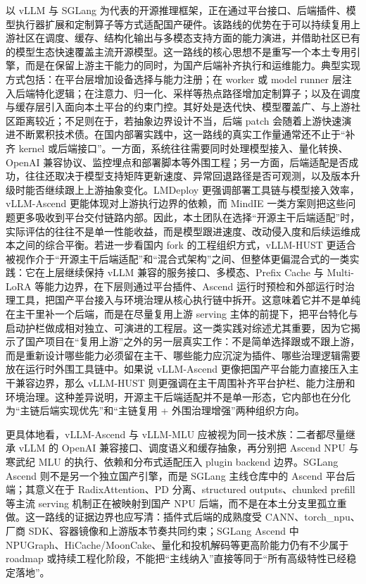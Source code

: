 以 vLLM 与 SGLang 为代表的开源推理框架，正在通过平台接口、后端插件、模型执行器扩展和定制算子等方式适配国产硬件\citep{vllm,sglang,sglangpaper,vllmascend}。该路线的优势在于可以持续复用上游社区在调度、缓存、结构化输出与多模态支持方面的能力演进，并借助社区已有的模型生态快速覆盖主流开源模型。这一路线的核心思想不是重写一个本土专用引擎，而是在保留上游主干能力的同时，为国产后端补齐执行和运维能力。典型实现方式包括：在平台层增加设备选择与能力注册；在 worker 或 model runner 层注入后端特化逻辑；在注意力、归一化、采样等热点路径增加定制算子；以及在调度与缓存层引入面向本土平台的约束门控。其好处是迭代快、模型覆盖广、与上游社区距离较近；不足则在于，若抽象边界设计不当，后端 patch 会随着上游快速演进不断累积技术债。在国内部署实践中，这一路线的真实工作量通常还不止于“补齐 kernel 或后端接口”。一方面，系统往往需要同时处理模型接入、量化转换、OpenAI 兼容协议、监控埋点和部署脚本等外围工程；另一方面，后端适配是否成功，往往还取决于模型支持矩阵更新速度、异常回退路径是否可观测，以及版本升级时能否继续跟上上游抽象变化。LMDeploy 更强调部署工具链与模型接入效率，vLLM-Ascend 更能体现对上游执行边界的依赖，而 MindIE 一类方案则把这些问题更多吸收到平台交付链路内部\citep{lmdeploy,vllmascend,mindie}。因此，本土团队在选择“开源主干后端适配”时，实际评估的往往不是单一性能收益，而是模型跟进速度、改动侵入度和后续运维成本之间的综合平衡。若进一步看国内 fork 的工程组织方式，vLLM-HUST 更适合被视作介于“开源主干后端适配”和“混合式架构”之间、但整体更偏混合式的一类实践：它在上层继续保持 vLLM 兼容的服务接口、多模态、Prefix Cache 与 Multi-LoRA 等能力边界，在下层则通过平台插件、Ascend 运行时预检和外部运行时治理工具，把国产平台接入与环境治理从核心执行链中拆开\citep{vllmhust}。这意味着它并不是单纯在主干里补一个后端，而是在尽量复用上游 serving 主体的前提下，把平台特化与启动护栏做成相对独立、可演进的工程层。这一类实践对综述尤其重要，因为它揭示了国产项目在“复用上游”之外的另一层真实工作：不是简单选择跟或不跟上游，而是重新设计哪些能力必须留在主干、哪些能力应沉淀为插件、哪些治理逻辑需要放在运行时外围工具链中。如果说 vLLM-Ascend 更像把国产平台能力直接压入主干兼容边界，那么 vLLM-HUST 则更强调在主干周围补齐平台护栏、能力注册和环境治理。这种差异说明，开源主干后端适配并不是单一形态，它内部也在分化为“主链后端实现优先”和“主链复用 + 外围治理增强”两种组织方向。

更具体地看，vLLM-Ascend 与 vLLM-MLU 应被视为同一技术族：二者都尽量继承 vLLM 的 OpenAI 兼容接口、调度语义和缓存抽象，再分别把 Ascend NPU 与寒武纪 MLU 的执行、依赖和分布式适配压入 plugin backend 边界\citep{vllmascend,vllmmlu}。SGLang Ascend 则不是另一个独立国产引擎，而是 SGLang 主线仓库中的 Ascend 平台后端；其意义在于 RadixAttention、PD 分离、structured outputs、chunked prefill 等主流 serving 机制正在被映射到国产 NPU 后端，而不是在本土分支里孤立重做\citep{sglang,sglang_ascend_npu}。这一路线的证据边界也应写清：插件式后端的成熟度受 CANN、torch\_npu、厂商 SDK、容器镜像和上游版本节奏共同约束；SGLang Ascend 中 NPUGraph、HiCache/MoonCake、量化和投机解码等更高阶能力仍有不少属于 roadmap 或持续工程化阶段，不能把“主线纳入”直接等同于“所有高级特性已经稳定落地”\citep{sglang_ascend_roadmap_2026}。

